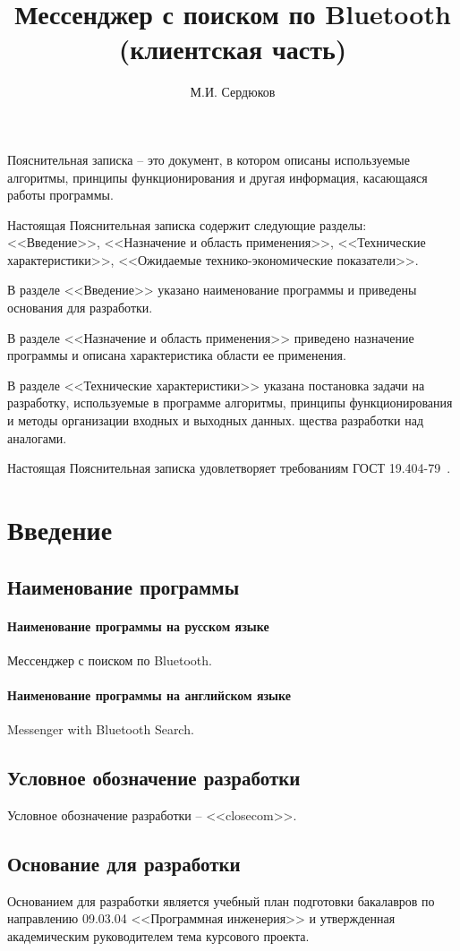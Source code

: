 \documentclass[explnote]{espd}
\author{М.И. Сердюков}
\title{Мессенджер с поиском по Bluetooth\\(клиентская часть)}
\begin{document}
\annotation
Пояснительная записка -- это документ, в котором описаны используемые алгоритмы, принципы функционирования и другая информация, касающаяся работы программы.

Настоящая Пояснительная записка содержит следующие разделы: <<Введение>>, <<Назначение и область применения>>, <<Технические характеристики>>, <<Ожидаемые технико-экономические показатели>>.

В разделе <<Введение>> указано наименование программы и приведены основания для разработки.

В разделе <<Назначение и область применения>> приведено назначение программы и описана характеристика области ее применения.

В разделе <<Технические характеристики>> указана постановка задачи на разработку, используемые в программе алгоритмы, принципы функционирования и методы организации входных и выходных данных.
щества разработки над аналогами.

Настоящая Пояснительная записка удовлетворяет требованиям ГОСТ 19.404-79~\cite{espd404}.

\tableofcontents

\section{Введение}
\subsection{Наименование программы}
\paragraph{Наименование программы на русском языке}
Мессенджер с поиском по Bluetooth.
\paragraph{Наименование программы на английском языке}
Messenger with Bluetooth Search.

\subsection{Условное обозначение разработки}
Условное обозначение разработки -- <<closecom>>.

\subsection{Основание для разработки}
Основанием для разработки является учебный план подготовки бакалавров по направлению 09.03.04 <<Программная инженерия>> и утвержденная академическим руководителем тема курсового проекта.
\end{document}
